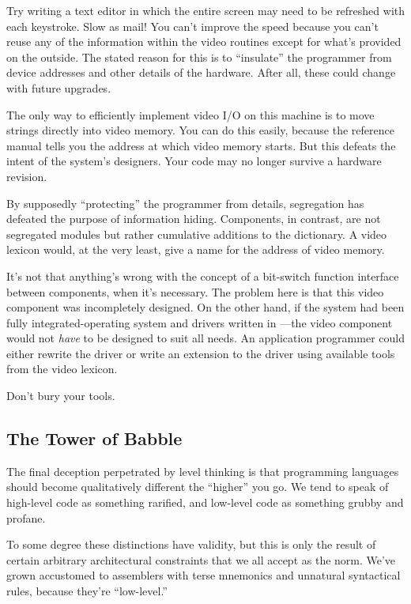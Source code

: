 Try writing a text editor in which the entire screen may need to be
refreshed with each keystroke. Slow as mail! You can't improve the speed
because you can't reuse any of the information within the video routines
except for what's provided on the outside. The stated reason for this is to
``insulate'' the programmer from device addresses and other details of
the hardware. After all, these could change with future upgrades.

The only way to efficiently implement video I/O on this machine is
to move strings directly into video memory. You can do this easily,
because the reference manual tells you the address at which video
memory starts. But this defeats the intent of the system's designers.
Your code may no longer survive a hardware revision.

By supposedly ``protecting'' the programmer from details, segregation
has defeated the purpose of information hiding. Components, in
contrast, are not segregated modules but rather cumulative additions
to the dictionary. A video lexicon would, at the very least, give a
name for the address of video memory.

It's not that anything's wrong with the concept of a bit-switch
function interface between components, when it's necessary. The
problem here is that this video component was incompletely
designed. On the other hand, if the system had been fully
integrated-operating system and drivers written in \Forth{}---the video
component would not \emph{have} to be designed to suit all needs. An
application programmer could either rewrite the driver or write an
extension to the driver using available tools from the video lexicon.

\begin{tip}
Don't bury your tools.
\end{tip}

\subsection{The Tower of Babble}

The final deception perpetrated by level thinking is that programming
languages should become qualitatively different the ``higher'' you go. We
tend to speak of high-level code as something rarified, and low-level code
as something grubby and profane.

To some degree these distinctions have validity, but this is only the
result of certain arbitrary architectural constraints that we all accept as
the norm. We've grown accustomed to assemblers with terse mnemonics
and unnatural syntactical rules, because they're ``low-level.''

